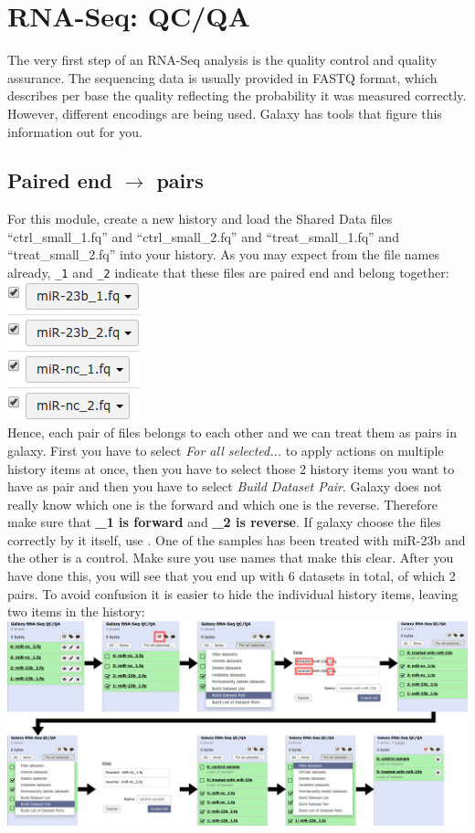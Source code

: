 \section{RNA-Seq: QC/QA}
The very first step of an RNA-Seq analysis is the quality control and quality assurance. The sequencing data is usually provided in FASTQ format, which describes per base the quality reflecting the probability it was measured correctly. However, different encodings are being used. Galaxy has tools that figure this information out for you.

\subsection{Paired end $\rightarrow$ pairs}
For this module, create a new history and load the Shared Data files ``ctrl\_small\_1.fq'' and ``ctrl\_small\_2.fq'' and ``treat\_small\_1.fq'' and ``treat\_small\_2.fq'' into your history. As you may expect from the file names already, \verb|_1| and \verb|_2| indicate that these files are paired end and belong together:\\
\includegraphics[scale=0.65]{figures/qc_01.png}\\
Hence, each pair of files belongs to each other and we can treat them as pairs in galaxy. First you have to select \textit{For all selected...} to apply actions on multiple history items at once, then you have to select those 2 history items you want to have as pair and then you have to select \textit{Build Dataset Pair}. Galaxy does not really know which one is the forward and which one is the reverse. Therefore make sure that \textbf{\_1 is forward} and \textbf{\_2 is reverse}. If galaxy choose the files correctly by it itself, use . One of the samples has been treated with miR-23b and the other is a control. Make sure you use names that make this clear. After you have done this, you will see that you end up with 6 datasets in total, of which 2 pairs. To avoid confusion it is easier to hide the individual history items, leaving two items in the history:\\
\includegraphics[width=\textwidth]{figures/qc_02.png}\\

